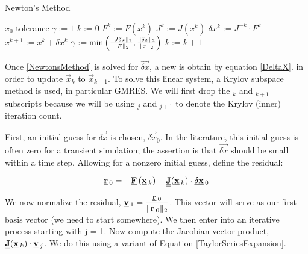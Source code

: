 \begin{algorithm}
\setlength{\baselineskip}{0.625\baselineskip}
\caption{Newton's Method}
\begin{algorithmic}[1]
\Define $x_0$
\Define tolerance
\State $\gamma := 1$
\State $k := 0$
    \State $F^k := F(x^k)$ 
    \State $J^k := J(x^k)$ 
    \State $\delta x^k := J^{-k} \cdot F^k$ 
    \State $x^{k+1} := x^k + \delta x^k$ 
    \State $\gamma := \text{min}\left(\frac{\norm{J \delta x}{2}}{\norm{F}{2}},\frac{\norm{\delta x}{2}}{\norm{x}{2}}\right)$ 
    \State $k := k + 1$ 
\EndWhile
\end{algorithmic}
\end{algorithm}


Once \eqref{NewtonsMethod} is solved for $\Vec{\delta x}$, a new  is obtain by equation \eqref{DeltaX}. in order to update $\Vec{x}_k$ to $\Vec{x}_{k+1}$. 
To solve this linear system, a Krylov subspace method is used, in particular GMRES.
We will first drop the $_k$ and $_{k+1}$ subscripts because we will be using $_j$ and $_{j+1}$ to denote the Krylov (inner) iteration count.

First, an initial guess for $\Vec{\delta x}$ is chosen, $\Vec{\delta x}_0$.
In the literature, this initial guess is often zero for a transient simulation; the assertion is that $\Vec{\delta x}$ should be small within a time step.
Allowing for a nonzero initial guess, define the residual:

\begin{equation}
\Vec{r}_0 = -\Vec{F}(\Vec{x}_k)-\Mat{J}(\Vec{x}_k)\cdot\Vec{\delta x}_0
\end{equation}

We now normalize the residual, $\displaystyle \Vec{v}_1 = \frac{\Vec{r}_0}{\norm{\Vec{r}_0}{2}}$.
This vector will serve as our first basis vector (we need to start somewhere).
We then enter into an iterative process starting with j = 1.
Now compute the Jacobian-vector product, $\Mat{J}(\Vec{x}_k)\cdot\Vec{v}_j$.
We do this using a variant of Equation \eqref{TaylorSeriesExpansion}.

